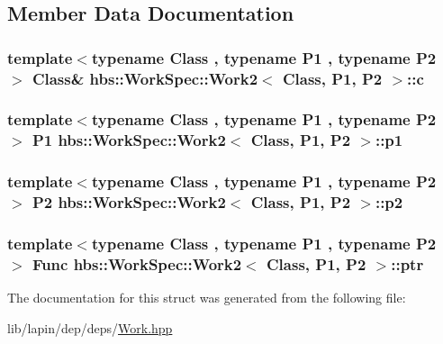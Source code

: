\subsection{Member Data Documentation}
\hypertarget{structhbs_1_1_work_spec_1_1_work2_a9ce24aa0ba2d7a16b4ab428f3612d73f}{
\subsubsection[{c}]{\setlength{\rightskip}{0pt plus 5cm}template$<$typename Class , typename P1 , typename P2 $>$ Class\& {\bf hbs\-::\-Work\-Spec\-::\-Work2}$<$ Class, P1, P2 $>$\-::c}}\label{structhbs_1_1_work_spec_1_1_work2_a9ce24aa0ba2d7a16b4ab428f3612d73f}
\hypertarget{structhbs_1_1_work_spec_1_1_work2_a340ca28ca16ad76091a899e183ed48c1}{
\subsubsection[{p1}]{\setlength{\rightskip}{0pt plus 5cm}template$<$typename Class , typename P1 , typename P2 $>$ P1 {\bf hbs\-::\-Work\-Spec\-::\-Work2}$<$ Class, P1, P2 $>$\-::p1}}\label{structhbs_1_1_work_spec_1_1_work2_a340ca28ca16ad76091a899e183ed48c1}
\hypertarget{structhbs_1_1_work_spec_1_1_work2_a2d8479e3bbdf73c26b1199073757390f}{
\subsubsection[{p2}]{\setlength{\rightskip}{0pt plus 5cm}template$<$typename Class , typename P1 , typename P2 $>$ P2 {\bf hbs\-::\-Work\-Spec\-::\-Work2}$<$ Class, P1, P2 $>$\-::p2}}\label{structhbs_1_1_work_spec_1_1_work2_a2d8479e3bbdf73c26b1199073757390f}
\hypertarget{structhbs_1_1_work_spec_1_1_work2_a92100158ede3a93764cb3d511bd85f39}{
\subsubsection[{ptr}]{\setlength{\rightskip}{0pt plus 5cm}template$<$typename Class , typename P1 , typename P2 $>$ {\bf Func} {\bf hbs\-::\-Work\-Spec\-::\-Work2}$<$ Class, P1, P2 $>$\-::ptr}}\label{structhbs_1_1_work_spec_1_1_work2_a92100158ede3a93764cb3d511bd85f39}


The documentation for this struct was generated from the following file\-:\begin{DoxyCompactItemize}
\item 
lib/lapin/dep/deps/\hyperlink{_work_8hpp}{Work.\-hpp}\end{DoxyCompactItemize}

